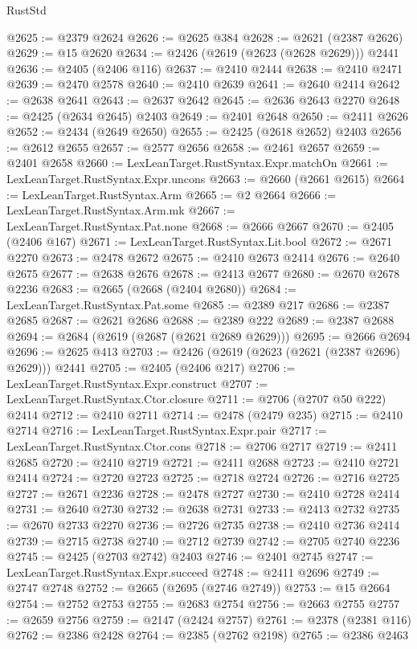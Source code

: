 \begin{lexlean}{RustStd}
\begin{coremodule}
@2625 := @2379 @2624
@2626 := @2625 @384
@2628 := @2621 (@2387 @2626)
@2629 := @15 @2620
@2634 := @2426 (@2619 (@2623 (@2628 @2629))) @2441
@2636 := @2405 (@2406 @116)
@2637 := @2410 @2444
@2638 := @2410 @2471
@2639 := @2470 @2578
@2640 := @2410 @2639
@2641 := @2640 @2414
@2642 := @2638 @2641
@2643 := @2637 @2642
@2645 := @2636 @2643 @2270
@2648 := @2425 (@2634 @2645) @2403
@2649 := @2401 @2648
@2650 := @2411 @2626
@2652 := @2434 (@2649 @2650)
@2655 := @2425 (@2618 @2652) @2403
@2656 := @2612 @2655
@2657 := @2577 @2656
@2658 := @2461 @2657
@2659 := @2401 @2658
@2660 := LexLeanTarget.RustSyntax.Expr.matchOn
@2661 := LexLeanTarget.RustSyntax.Expr.uncons
@2663 := @2660 (@2661 @2615)
@2664 := LexLeanTarget.RustSyntax.Arm
@2665 := @2 @2664
@2666 := LexLeanTarget.RustSyntax.Arm.mk
@2667 := LexLeanTarget.RustSyntax.Pat.none
@2668 := @2666 @2667
@2670 := @2405 (@2406 @167)
@2671 := LexLeanTarget.RustSyntax.Lit.bool
@2672 := @2671 @2270
@2673 := @2478 @2672
@2675 := @2410 @2673 @2414
@2676 := @2640 @2675
@2677 := @2638 @2676
@2678 := @2413 @2677
@2680 := @2670 @2678 @2236
@2683 := @2665 (@2668 (@2404 @2680))
@2684 := LexLeanTarget.RustSyntax.Pat.some
@2685 := @2389 @217
@2686 := @2387 @2685
@2687 := @2621 @2686
@2688 := @2389 @222
@2689 := @2387 @2688
@2694 := @2684 (@2619 (@2687 (@2621 @2689 @2629)))
@2695 := @2666 @2694
@2696 := @2625 @413
@2703 := @2426 (@2619 (@2623 (@2621 (@2387 @2696) @2629))) @2441
@2705 := @2405 (@2406 @217)
@2706 := LexLeanTarget.RustSyntax.Expr.construct
@2707 := LexLeanTarget.RustSyntax.Ctor.closure
@2711 := @2706 (@2707 @50 @222) @2414
@2712 := @2410 @2711
@2714 := @2478 (@2479 @235)
@2715 := @2410 @2714
@2716 := LexLeanTarget.RustSyntax.Expr.pair
@2717 := LexLeanTarget.RustSyntax.Ctor.cons
@2718 := @2706 @2717
@2719 := @2411 @2685
@2720 := @2410 @2719
@2721 := @2411 @2688
@2723 := @2410 @2721 @2414
@2724 := @2720 @2723
@2725 := @2718 @2724
@2726 := @2716 @2725
@2727 := @2671 @2236
@2728 := @2478 @2727
@2730 := @2410 @2728 @2414
@2731 := @2640 @2730
@2732 := @2638 @2731
@2733 := @2413 @2732
@2735 := @2670 @2733 @2270
@2736 := @2726 @2735
@2738 := @2410 @2736 @2414
@2739 := @2715 @2738
@2740 := @2712 @2739
@2742 := @2705 @2740 @2236
@2745 := @2425 (@2703 @2742) @2403
@2746 := @2401 @2745
@2747 := LexLeanTarget.RustSyntax.Expr.succeed
@2748 := @2411 @2696
@2749 := @2747 @2748
@2752 := @2665 (@2695 (@2746 @2749))
@2753 := @15 @2664
@2754 := @2752 @2753
@2755 := @2683 @2754
@2756 := @2663 @2755
@2757 := @2659 @2756
@2759 := @2147 (@2424 @2757)
@2761 := @2378 (@2381 @116)
@2762 := @2386 @2428
@2764 := @2385 (@2762 @2198)
@2765 := @2386 @2463

\end{coremodule}
\end{lexlean}
